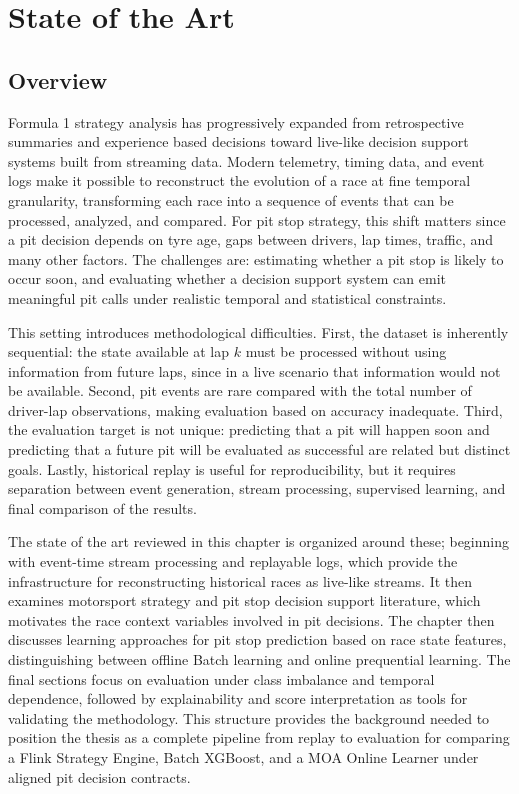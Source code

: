 \chapter{State of the Art}
\label{ch:state_of_the_art}

\section{Overview}

Formula 1 strategy analysis has progressively expanded from retrospective summaries and experience based decisions toward live-like decision support systems built from streaming data.
Modern telemetry, timing data, and event logs make it possible to reconstruct the evolution of a race at fine temporal granularity, transforming each race into a
sequence of events that can be processed, analyzed, and compared.
For pit stop strategy, this shift matters since a pit decision depends on tyre age, gaps between drivers, lap times,
traffic, and many other factors. The challenges are:
estimating whether a pit stop is likely to occur soon, and evaluating whether a decision support system can emit meaningful pit calls under realistic temporal and statistical
constraints.

This setting introduces methodological difficulties.
First, the dataset is inherently sequential: the state available at lap $k$ must be processed without using information from future laps, since in a live
scenario that information would not be available.
Second, pit events are rare compared with the total number of driver-lap observations, making evaluation based on accuracy inadequate.
Third, the evaluation target is not unique: predicting that a pit will happen soon and predicting that a future pit will be evaluated as successful are related but distinct
goals.
Lastly, historical replay is useful for reproducibility, but it requires separation between event generation, stream processing, supervised learning,
and final comparison of the results.

The state of the art reviewed in this chapter is organized around these; beginning with event-time stream processing and replayable logs, which provide
the infrastructure for reconstructing historical races as live-like streams. It then examines motorsport strategy and pit stop decision support literature, which motivates
the race context variables involved in pit decisions. The chapter then discusses learning approaches for pit stop prediction based on race state features,
distinguishing between offline Batch learning and online prequential learning.
The final sections focus on evaluation under class imbalance and temporal dependence, followed by explainability and score interpretation
as tools for validating the methodology. This structure provides the background needed to position the thesis as a complete pipeline from replay to evaluation for comparing a
Flink Strategy Engine, Batch XGBoost, and a MOA Online Learner under aligned pit decision contracts.


